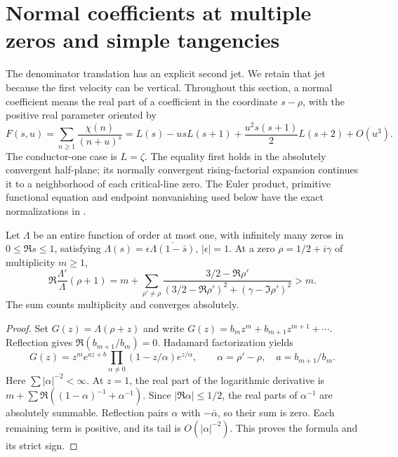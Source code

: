 \section{Normal coefficients at multiple zeros and simple tangencies}
\label{sec:motion-bending}

The denominator translation has an explicit second jet. We retain
that jet because the first velocity can be vertical. Throughout
this section, a normal coefficient means the real part of a
coefficient in the coordinate $s-\rho$, with the positive real
parameter oriented by
\[
 F(s,u)=\sum_{n\ge1}\frac{\chi(n)}{(n+u)^s}
 =L(s)-usL(s+1)+\frac{u^2s(s+1)}2L(s+2)+O(u^3).
\]
The conductor-one case is $L=\zeta$. The equality first holds
in the absolutely convergent half-plane; its normally convergent
rising-factorial expansion continues it to a neighborhood of
each critical-line zero. The Euler product, primitive functional
equation and endpoint nonvanishing used below have the exact
normalizations in \cite[Section~25.15, equations (2), (5), (6), (9)]{dlmf}.

\begin{lemma}
\label{lem:reflected-positive-new}
Let $\Lambda$ be an entire function of order at most one, with
infinitely many zeros in $0\le\Re s\le1$, satisfying
$\Lambda(s)=\epsilon\overline{\Lambda(1-\bar s)}$, $|\epsilon|=1$.
At a zero $\rho=1/2+i\gamma$ of multiplicity $m\ge1$,
\begin{equation}\label{eq:reflected-positive-new}
 \Re\frac{\Lambda'}{\Lambda}(\rho+1)
 =m+\sum_{\rho'\ne\rho}
 \frac{3/2-\Re\rho'}{(3/2-\Re\rho')^2+(\gamma-\Im\rho')^2}>m.
\end{equation}
The sum counts multiplicity and converges absolutely.
\end{lemma}

\begin{proof}
Set $G(z)=\Lambda(\rho+z)$ and write
$G(z)=b_mz^m+b_{m+1}z^{m+1}+\cdots$. Reflection gives
$\Re(b_{m+1}/b_m)=0$. Hadamard factorization yields
\[
 G(z)=z^m e^{az+b}\prod_{\alpha\ne0}
       (1-z/\alpha)e^{z/\alpha},\qquad
 \alpha=\rho'-\rho,\quad a=b_{m+1}/b_m.
\]
Here $\sum|\alpha|^{-2}<\infty$. At $z=1$, the real part
of the logarithmic derivative is
$m+\sum\Re((1-\alpha)^{-1}+\alpha^{-1})$.
Since $|\Re\alpha|\le1/2$, the real parts of
$\alpha^{-1}$ are absolutely summable. Reflection pairs
$\alpha$ with $-\bar\alpha$, so their sum is zero.
Each remaining term is positive, and its tail is
$O(|\alpha|^{-2})$. This proves the formula and its strict sign.
\end{proof}

